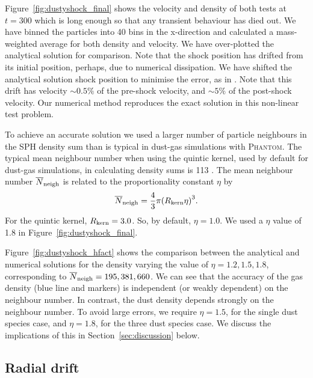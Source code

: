 \documentclass[fleqn,usenatbib]{mnras}
\begin{document}
Figure~\ref{fig:dustyshock_final} shows the velocity and density of both tests
at \(t = 300\) which is long enough so that any transient behaviour has died
out. We have binned the particles into 40 bins in the x-direction and calculated
a mass-weighted average for both density and velocity. We have over-plotted the
analytical solution for comparison. Note that the shock position has drifted
from its initial position, perhaps, due to numerical dissipation. We have
shifted the analytical solution shock position to minimise the error, as in
\citet{Benitez-Llambay2019ApJS..241...25B}. Note that this drift has velocity
\(\sim 0.5\%\) of the pre-shock velocity, and \(\sim 5\%\) of the post-shock
velocity. Our numerical method reproduces the exact solution in this non-linear
test problem.

To achieve an accurate solution we used a larger number of particle neighbours
in the SPH density sum than is typical in dust-gas simulations with
\textsc{Phantom}. The typical mean neighbour number when using the quintic
kernel, used by default for dust-gas simulations, in calculating density sums is
113 \citep{Price2018PASA...35...31P}. The mean neighbour number
\(\overline{N}_{\rm neigh}\) is related to the proportionality constant \(\eta\)
by
%
\begin{align}
   \overline{N}_{\rm neigh} = \frac{4}{3} \pi
      {\left( R_{\rm kern} \eta \right)}^3.
\end{align}
%
For the quintic kernel, \( R_{\rm kern} = 3.0 \). So, by default, \(\eta =
1.0\). We used a \(\eta\) value of 1.8 in Figure~\ref{fig:dustyshock_final}.

Figure~\ref{fig:dustyshock_hfact} shows the comparison between the analytical
and numerical solutions for the density varying the value of \(\eta = 1.2, 1.5,
1.8\), corresponding to \(\overline{N}_{\rm neigh} = 195, 381, 660\). We can see
that the accuracy of the gas density (blue line and markers) is independent (or
weakly dependent) on the neighbour number. In contrast, the dust density depends
strongly on the neighbour number. To avoid large errors, we require \(\eta =
1.5\), for the single dust species case, and \(\eta = 1.8\), for the three dust
species case. We discuss the implications of this in
Section~\ref{sec:discussion} below.


\subsection{Radial drift}%
\label{subsec:radialdrift}
\end{document}
